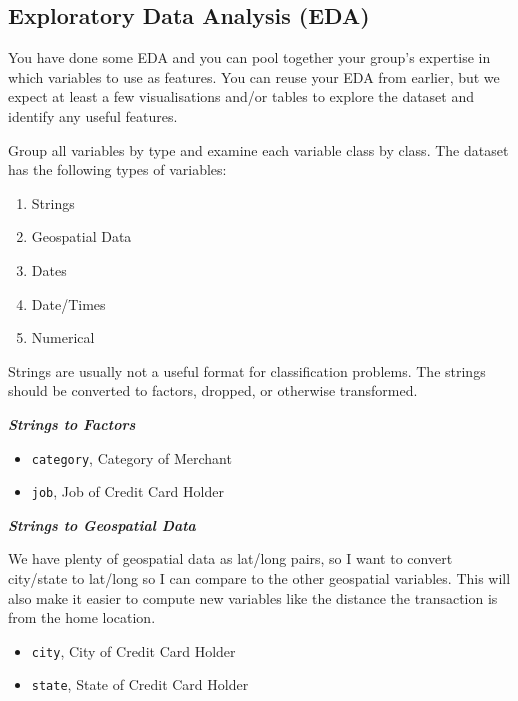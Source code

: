 \documentclass[
]{article}
\providecommand{\tightlist}{%
  \setlength{\itemsep}{0pt}\setlength{\parskip}{0pt}}
\begin{document}
\hypertarget{exploratory-data-analysis-eda}{%
\subsection{Exploratory Data Analysis
(EDA)}\label{exploratory-data-analysis-eda}}

You have done some EDA and you can pool together your group's expertise
in which variables to use as features. You can reuse your EDA from
earlier, but we expect at least a few visualisations and/or tables to
explore the dataset and identify any useful features.

Group all variables by type and examine each variable class by class.
The dataset has the following types of variables:

\begin{enumerate}
\def\labelenumi{\arabic{enumi}.}
\tightlist
\item
  Strings
\item
  Geospatial Data
\item
  Dates
\item
  Date/Times
\item
  Numerical
\end{enumerate}

Strings are usually not a useful format for classification problems. The
strings should be converted to factors, dropped, or otherwise
transformed.

\textbf{\emph{Strings to Factors}}

\begin{itemize}
\tightlist
\item
  \texttt{category}, Category of Merchant
\item
  \texttt{job}, Job of Credit Card Holder
\end{itemize}

\textbf{\emph{Strings to Geospatial Data}}

We have plenty of geospatial data as lat/long pairs, so I want to
convert city/state to lat/long so I can compare to the other geospatial
variables. This will also make it easier to compute new variables like
the distance the transaction is from the home location.

\begin{itemize}
\tightlist
\item
  \texttt{city}, City of Credit Card Holder
\item
  \texttt{state}, State of Credit Card Holder
\end{itemize}
\end{document}
